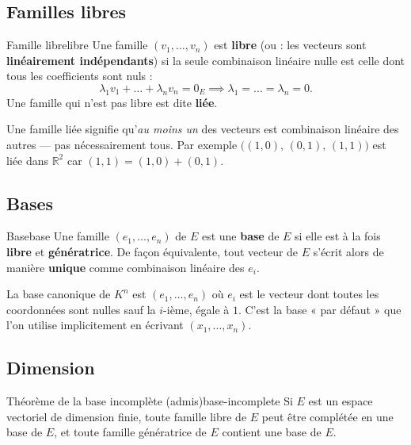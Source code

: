 \documentclass[theme=pringlea]{myrtille}
\begin{document}
\subsection{Familles libres}
\begin{myrdef}{Famille libre}{libre}
Une famille $(v_1, \dots, v_n)$ est \textbf{libre} (ou : les vecteurs sont \textbf{linéairement indépendants}) si la seule combinaison linéaire nulle est celle dont tous les coefficients sont nuls :
\[ \lambda_1 v_1 + \dots + \lambda_n v_n = 0_E \implies \lambda_1 = \dots = \lambda_n = 0. \]
Une famille qui n'est pas libre est dite \textbf{liée}.
\end{myrdef}

\begin{warnbox}
Une famille liée signifie qu'\emph{au moins un} des vecteurs est combinaison linéaire des autres — pas nécessairement tous. Par exemple $\big((1,0),\,(0,1),\,(1,1)\big)$ est liée dans $\mathbb{R}^2$ car $(1,1) = (1,0)+(0,1)$.
\end{warnbox}

\subsection{Bases}
\begin{myrdef}{Base}{base}
Une famille $(e_1, \dots, e_n)$ de $E$ est une \textbf{base} de $E$ si elle est à la fois \textbf{libre} et \textbf{génératrice}. De façon équivalente, tout vecteur de $E$ s'écrit alors de manière \textbf{unique} comme combinaison linéaire des $e_i$.
\end{myrdef}

\begin{infobox}
La base canonique de $K^n$ est $(e_1, \dots, e_n)$ où $e_i$ est le vecteur dont toutes les coordonnées sont nulles sauf la $i$-ième, égale à $1$. C'est la base « par défaut » que l'on utilise implicitement en écrivant $(x_1, \dots, x_n)$.
\end{infobox}

\subsection{Dimension}
\begin{myrthm}{Théorème de la base incomplète (admis)}{base-incomplete}
Si $E$ est un espace vectoriel de dimension finie, toute famille libre de $E$ peut être complétée en une base de $E$, et toute famille génératrice de $E$ contient une base de $E$.
\end{myrthm}
\end{document}
